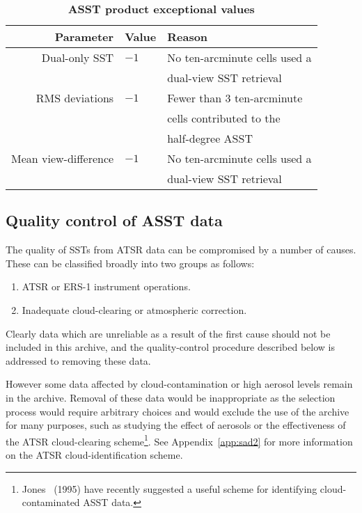 \begin{table}
\begin{center}
\caption{\bf ASST product exceptional values}
\label{tab:exc}
\begin{tabular}{|r|l|l|} \hline

{\bf Parameter}      & {\bf Value} & {\bf Reason}              \\ \hline \hline

Dual-only SST        & $-1$        & No ten-arcminute cells used a \\
                     &             & dual-view SST retrieval       \\ \hline
RMS deviations       & $-1$        & Fewer than 3 ten-arcminute    \\
                     &             & cells contributed to the      \\
                     &             & half-degree ASST              \\ \hline
Mean view-difference & $-1$        & No ten-arcminute cells used a \\
                     &             & dual-view SST retrieval       \\ \hline
\end{tabular}
\end{center}
\end{table}



\clearpage
\subsection{Quality control of ASST data}
\label{subsec:qa}

The quality of SSTs from ATSR data can be compromised by a number of causes.
These can be classified broadly into two groups as follows:
\begin{enumerate}
\item ATSR or ERS-1 instrument operations.
\item Inadequate cloud-clearing or atmospheric correction.
\end{enumerate}

Clearly data which are unreliable as a result of the first cause should not
be included in this archive, and the quality-control procedure described
below is addressed to removing these data.


However some data affected by cloud-contamination or high aerosol levels remain
in the archive. 
Removal of these data would be inappropriate as the selection process 
would require arbitrary choices and
would exclude the use of the archive for many purposes, such as 
studying the  effect of aerosols or the effectiveness of the ATSR 
cloud-clearing scheme\footnote{Jones \etal\ (1995) have recently 
suggested a useful scheme for identifying cloud-contaminated ASST data.}.
See Appendix~\ref{app:sad2} for more information on the ATSR 
cloud-identification scheme.

